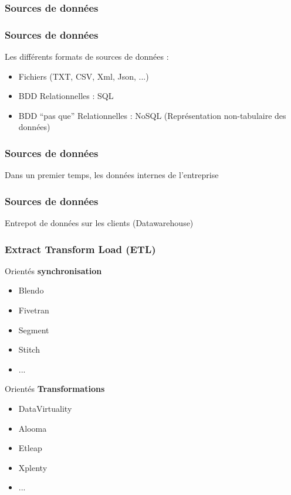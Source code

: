 \begin{frame}
  \frametitle{Sources de données}
\end{frame}

\begin{frame}
  \frametitle{Sources de données}
  Les différents formats de sources de  données :
  \begin{itemize}
  \item Fichiers (TXT, CSV, Xml, Json, ...)
  \item BDD Relationnelles : SQL
  \item BDD ``pas que'' Relationnelles : NoSQL (Représentation non-tabulaire des données)
  \end{itemize}
\end{frame}

\begin{frame}
  \frametitle{Sources de données}
  Dans un premier temps, les données internes de l'entreprise
\end{frame}

\begin{frame}
  \frametitle{Sources de données}
  Entrepot de données sur les clients (Datawarehouse)
\end{frame}

\begin{frame}
  \frametitle{Extract Transform Load (ETL)}
  \begin{minipage}[l]{0.49\linewidth}
    Orientés \textbf{synchronisation}
    \begin{itemize}
    \item Blendo
    \item Fivetran
    \item Segment
    \item Stitch
    \item ...
    \end{itemize}
  \end{minipage}\hfill
  \begin{minipage}[l]{0.49\linewidth}
    Orientés \textbf{Transformations}
    \begin{itemize}
    \item DataVirtuality
    \item Alooma
    \item Etleap
    \item Xplenty
    \item ...
    \end{itemize}
  \end{minipage}\hfill
\end{frame}

